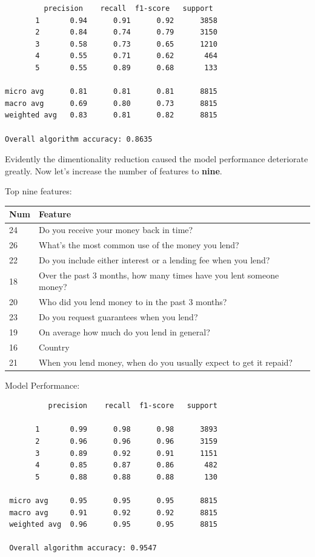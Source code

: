 \begin{verbatim}
         precision    recall  f1-score   support
       1       0.94      0.91      0.92      3858
       2       0.84      0.74      0.79      3150
       3       0.58      0.73      0.65      1210
       4       0.55      0.71      0.62       464
       5       0.55      0.89      0.68       133

micro avg      0.81      0.81      0.81      8815
macro avg      0.69      0.80      0.73      8815
weighted avg   0.83      0.81      0.82      8815

Overall algorithm accuracy: 0.8635
\end{verbatim}

Evidently the dimentionality reduction caused the model performance
deteriorate greatly. Now let's increase the number of features to
\textbf{nine}.

Top nine features:

\begin{longtable}[]{@{}ll@{}}
\toprule
Num & Feature\tabularnewline
\midrule
\endhead
24 & Do you receive your money back in time?\tabularnewline
26 & What's the most common use of the money you lend?\tabularnewline
22 & Do you include either interest or a lending fee when you
lend?\tabularnewline
18 & Over the past 3 months, how many times have you lent someone
money?\tabularnewline
20 & Who did you lend money to in the past 3 months?\tabularnewline
23 & Do you request guarantees when you lend?\tabularnewline
19 & On average how much do you lend in general?\tabularnewline
16 & Country\tabularnewline
21 & When you lend money, when do you usually expect to get it
repaid?\tabularnewline
\bottomrule
\end{longtable}

Model Performance:

\begin{verbatim}
          precision    recall  f1-score   support

       1       0.99      0.98      0.98      3893
       2       0.96      0.96      0.96      3159
       3       0.89      0.92      0.91      1151
       4       0.85      0.87      0.86       482
       5       0.88      0.88      0.88       130

 micro avg     0.95      0.95      0.95      8815
 macro avg     0.91      0.92      0.92      8815
 weighted avg  0.96      0.95      0.95      8815
 
 Overall algorithm accuracy: 0.9547
\end{verbatim}

